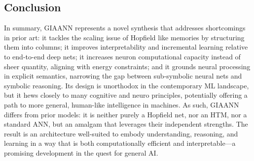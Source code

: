 \subsection{Conclusion}

In summary, GIAANN represents a novel synthesis that addresses shortcomings in prior art: it tackles the scaling issue of Hopfield like memories by structuring them into columns; it improves interpretability and incremental learning relative to end-to-end deep nets; it increases neuron computational capacity instead of sheer quantity, aligning with energy constraints; and it grounds neural processing in explicit semantics, narrowing the gap between sub-symbolic neural nets and symbolic reasoning.
Its design is unorthodox in the contemporary ML landscape, but it hews closely to many cognitive and neuro principles, potentially offering a path to more general, human-like intelligence in machines.
As such, GIAANN differs from prior models: it is neither purely a Hopfield net, nor an HTM, nor a standard ANN, but an amalgam that leverages their independent strengths.
The result is an architecture well-suited to embody understanding, reasoning, and learning in a way that is both computationally efficient and interpretable---a promising development in the quest for general AI.